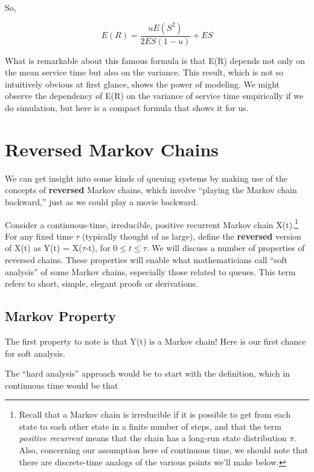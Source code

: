 So, 

\begin{equation}
\label{meanres2}
E(R) = \frac{u E(S^2)}{2ES(1-u)} + ES
\end{equation}

What is remarkable about this famous formula is that E(R) depends not
only on the mean service time but also on the variance.  This result,
which is not so intuitively obvious at first glance, shows the power of
modeling.  We might observe the dependency of E(R) on the variance of
service time empirically if we do simulation, but here is a compact
formula that shows it for us.

\section{Reversed Markov Chains}

We can get insight into some kinds of queuing systems by making use of
the concepts of {\bf reversed} Markov chains, which involve ``playing
the Markov chain backward,'' just as we could play a movie backward.

Consider a continuous-time, irreducible, positive recurrent Markov chain
X(t).\footnote{Recall that a Markov chain is irreducible if it is
possible to get from each state to each other state in a finite number
of steps, and that the term {\it positive recurrent} means that the
chain has a long-run state distribution $\pi$.  Also, concerning our
assumption here of continuous time, we should note that there are
discrete-time analogs of the various points we'll make below.}  For any
fixed time $\tau$ (typically thought of as large), define the {\bf
reversed} version of X(t) as Y(t) = X($\tau$-t), for $0 \leq t \leq
\tau$.  We will discuss a number of properties of reversed chains.
These properties will enable what mathematicians call ``soft analysis''
of some Markov chains, especially those related to queues.  This term
refers to short, simple, elegant proofs or derivations.

\subsection{Markov Property}
\label{contintimemarkovproperty}

The first property to note is that Y(t) is a Markov chain!  Here is our
first chance for soft analysis.  

The ``hard analysis'' approach would be to start with the definition,
which in continuous time would be that

